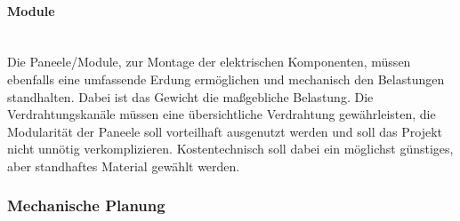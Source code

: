     \paragraph{Module}\mbox{}\\
    Die Paneele/Module, zur Montage der elektrischen Komponenten, müssen ebenfalls eine umfassende Erdung ermöglichen und mechanisch den Belastungen standhalten. Dabei ist das Gewicht die maßgebliche Belastung. Die Verdrahtungskanäle müssen eine übersichtliche Verdrahtung gewährleisten, die Modularität der Paneele soll vorteilhaft ausgenutzt werden und soll das Projekt nicht unnötig verkomplizieren. Kostentechnisch soll dabei ein möglichst günstiges, aber standhaftes Material gewählt werden.

\subsubsection{Mechanische Planung}
